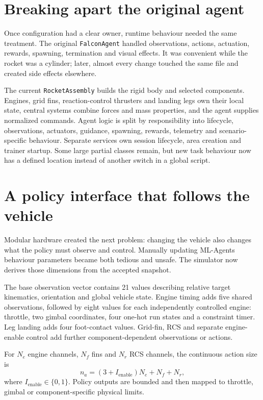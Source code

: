 \section{Breaking apart the original agent}

Once configuration had a clear owner, runtime behaviour needed the same treatment. The original
\texttt{FalconAgent} handled observations, actions, actuation, rewards, spawning, termination and
visual effects. It was convenient while the rocket was a cylinder; later, almost every change
touched the same file and created side effects elsewhere.

The current \texttt{RocketAssembly} builds the rigid body and selected components. Engines,
grid fins, reaction-control thrusters and landing legs own their local state, central systems
combine forces and mass properties, and the agent supplies normalized commands. Agent logic is
split by responsibility into lifecycle, observations, actuators, guidance, spawning, rewards,
telemetry and scenario-specific behaviour. Separate services own session lifecycle, area
creation and trainer startup. Some large partial classes remain, but new task behaviour now has
a defined location instead of another switch in a global script.

\section{A policy interface that follows the vehicle}

Modular hardware created the next problem: changing the vehicle also changes what the policy
must observe and control. Manually updating ML-Agents behaviour parameters became both tedious
and unsafe. The simulator now derives those dimensions from the accepted snapshot.

The base observation vector contains 21 values describing relative target kinematics,
orientation and global vehicle state. Engine timing adds five shared observations, followed by
eight values for each independently controlled engine: throttle, two gimbal coordinates, four
one-hot run states and a constraint timer. Leg landing adds four foot-contact values. Grid-fin,
RCS and separate engine-enable control add further component-dependent observations or actions.

For $N_e$ engine channels, $N_f$ fins and $N_r$ RCS channels, the continuous action size is
\begin{equation}
  n_a = (3+I_{\mathrm{enable}})N_e+N_f+N_r,
  \label{eq:actions}
\end{equation}
where $I_{\mathrm{enable}}\in\{0,1\}$. Policy outputs are bounded and then mapped to throttle,
gimbal or component-specific physical limits.

